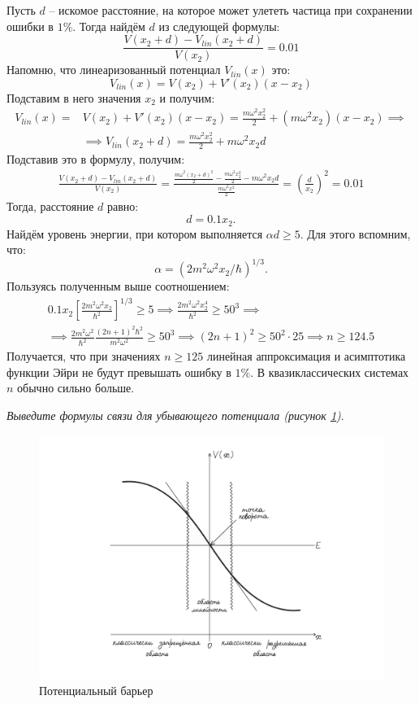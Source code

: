 Пусть $d$ -- искомое расстояние, на которое может улететь частица при сохранении ошибки в $1\%$. Тогда найдём $d$ из следующей формулы:
\[
\frac{V(x_2 + d) - V_{lin}(x_2 + d)}{V(x_2)} = 0.01
\]
Напомню, что линеаризованный потенциал $V_{lin}(x)$ это:
\[
V_{lin}(x) = V(x_2)  + V'(x_2)(x - x_2)
\]
Подставим в него значения $x_2$ и получим:
\begin{align*}
V_{lin}(x) = & V(x_2)  + V'(x_2)(x - x_2) = \frac{m\omega^2 x_2^2}{2} + (m\omega^2 x_2)(x-x_2)\implies \\
&\implies V_{lin}(x_2 + d) = \frac{m\omega^2 x_2^2}{2} + m\omega^2 x_2d
\end{align*}
Подставив это в формулу, получим:
\begin{gather*}
    \frac{V(x_2 + d) - V_{lin}(x_2 + d)}{V(x_2)} = \frac{\frac{m\omega^2 (x_2 + d)^2}{2} - \frac{m\omega^2 x_2^2}{2} - m\omega^2 x_2d}{\frac{m\omega^2 x^2}{2}} = \left(\frac{d}{x_2}\right)^2 =  0.01
\end{gather*}
Тогда, расстояние $d$ равно:
\[
d = 0.1x_2.
\]
Найдём уровень энергии, при котором выполняется $\alpha d \geq 5$. Для этого вспомним, что:
\[
\alpha = (2m^2\omega^2x_2/\hbar)^{1/3}.
\]
Пользуясь полученным выше соотношением:
\begin{gather*}
    0.1x_2\left[\frac{2m^2\omega^2x_2}{\hbar^2}\right]^{1/3} \geq 5 \implies \frac{2m^2\omega^2 x_2^4}{\hbar^2} \geq 50^3 \implies \\
   \implies \frac{2m^2\omega^2}{\hbar^2} \frac{(2n + 1)^2\hbar^2}{m^2\omega^2} \geq 50^3 \implies (2n+1)^2 \geq 50^2 \cdot 25 \implies n \geq 124.5
\end{gather*}
Получается, что при значениях $n\geq 125$ линейная аппроксимация и асимптотика функции Эйри не будут превышать ошибку в $1\%$. В квазиклассических системах $n$ обычно сильно больше.

\begin{center}
\textit{Выведите формулы связи для убывающего потенциала (рисунок \ref{fig C.1})}.
\end{center}
\begin{figure}[ht]
\centering
\includegraphics[scale=0.21]{appendix/images/left-turning-point.jpg}
\caption{Потенциальный барьер}
\label{fig C.1}
\end{figure}

